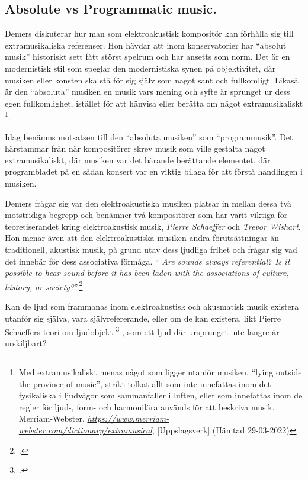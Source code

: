 \documentclass{article}
\begin{document}


\subsection{Absolute vs Programmatic music.}
Demers diskuterar hur man som elektroakustisk kompositör kan
förhålla sig till extramusikaliska referenser. Hon hävdar att inom konservatorier har ``absolut musik''
historiskt sett fått störst spelrum och har ansetts som norm. Det är en modernistisk stil som speglar den
modernistiska synen på objektivitet, där musiken eller konsten ska stå för sig själv som något sant och
fullkomligt. Likaså är den ``absoluta'' musiken en musik vars mening och syfte är sprunget ur dess egen
fullkomlighet, istället för att hänvisa eller berätta om något extramusikaliskt
\footnote{Med extramusikaliskt menas något som ligger utanför musiken, ``lying outside the province of
music'', strikt tolkat allt som inte innefattas inom det fysikaliska i ljudvågor som sammanfaller i
luften, eller som innefattas inom de regler för ljud-, form- och harmonilära används för att beskriva
musik. \\
Merriam-Webster, \emph{\url{https://www.merriam-webster.com/dictionary/extramusical}}, [Uppslagsverk] (Hämtad 29-03-2022)}.

Idag benämns motsatsen till den ``absoluta musiken'' som ``programmusik''. Det härstammar från när
kompositörer skrev musik som ville gestalta något extramusikaliskt, där musiken var det bärande berättande
elementet, där programbladet på en sådan konsert var en viktig bilaga för att förstå handlingen i musiken. 

Demers frågar sig var den elektroakustiska musiken platsar in mellan dessa två motstridiga begrepp och
benämner två kompositörer som har varit viktiga för teoretiserandet kring elektroakustisk musik, \emph{Pierre
Schaeffer} och \emph{Trevor Wishart}. Hon menar även att den elektroakustiska musiken andra förutsättningar än
traditionell, akustisk musik, på grund utav dess ljudliga frihet och frågar sig
vad det innebär för dess associativa förmåga. ``
\emph{Are sounds always referential? Is it possible to hear sound before it has been laden with the
associations of culture, history, or society?}''.\footcite[23]{JoannaDemers}

Kan de ljud som frammanas inom elektroakustisk och akusmatisk musik existera utanför sig
själva, vara självrefererande, eller om de kan existera, likt Pierre Schaeffers teori om
ljudobjekt
\footcite{PierreSchaeffer}
, som ett ljud där ursprunget inte längre är urskiljbart? 
\end{document}
